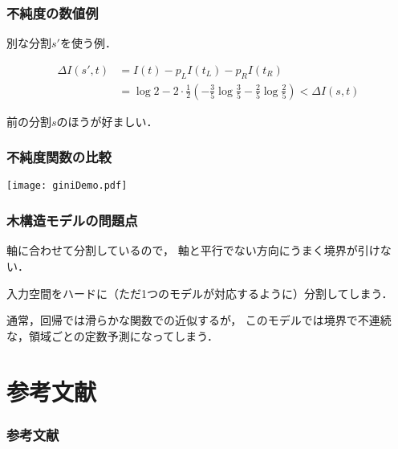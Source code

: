 \documentclass[10pt,hyperref={unicode}]{beamer}
\newenvironment{wideitemize}{\itemize\addtolength{\itemsep}{1em}}{\enditemize}
\newcommand{\parentheses}[1]{\left(#1\right)}
\begin{document}
\begin{frame}
\frametitle{不純度の数値例}
別な分割$s'$を使う例．

\bigskip

\begin{center}
\begin{figure}
\end{figure}
\end{center}
\begin{align*}
    \Delta I\parentheses{s',t}
    &= I\parentheses{t}
    - p_L I\parentheses{t_L}
    - p_R I \parentheses{t_R} \\
    &= \log 2
    - 2 \cdot \frac{1}{2} \parentheses{- \frac{3}{5}\log \frac{3}{5} - \frac{2}{5} \log \frac{2}{5}} < \Delta I\parentheses{s, t}
\end{align*}

\bigskip

前の分割$s$のほうが好ましい．
\end{frame}

\begin{frame}
\frametitle{不純度関数の比較}
\begin{center}
    \texttt{[image: giniDemo.pdf]}
\end{center}
\end{frame}

\begin{frame}
\frametitle{木構造モデルの問題点}
\begin{wideitemize}
\item 軸に合わせて分割しているので，
    軸と平行でない方向にうまく境界が引けない．
\item 入力空間をハードに（ただ1つのモデルが対応するように）分割してしまう．
\item 通常，回帰では滑らかな関数での近似するが，
    このモデルでは境界で不連続な，領域ごとの定数予測になってしまう．
\end{wideitemize}
\end{frame}

\section{参考文献}
\begin{frame}
\frametitle{参考文献}
    
    
\end{frame}
\end{document}
